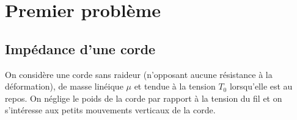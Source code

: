 \documentclass[a4paper,french,bookmarks]{article}
\begin{document}
    \renewcommand{\thesection}{\Roman{section}} 
    \renewcommand{\thesubsection}{\thesection.\Alph{subsection}}
    \renewcommand{\labelenumi}{\thesection.\arabic{enumi}.}
    \renewcommand*{\labelenumii}{\alph{enumii}.}
    \renewcommand*{\labelenumiii}{\alph{enumiii}.}
    
    
    \section{Premier problème}
    
    \subsection{Impédance d'une corde}
    
    On considère une corde sans raideur (n'opposant aucune résistance à la déformation), de masse linéique $\mu$ et tendue à la tension $T_0$ lorsqu'elle est au repos. On néglige le poids de la corde par rapport à la tension du fil et on s'intéresse aux petits mouvements verticaux de la corde.
    
\end{document}
